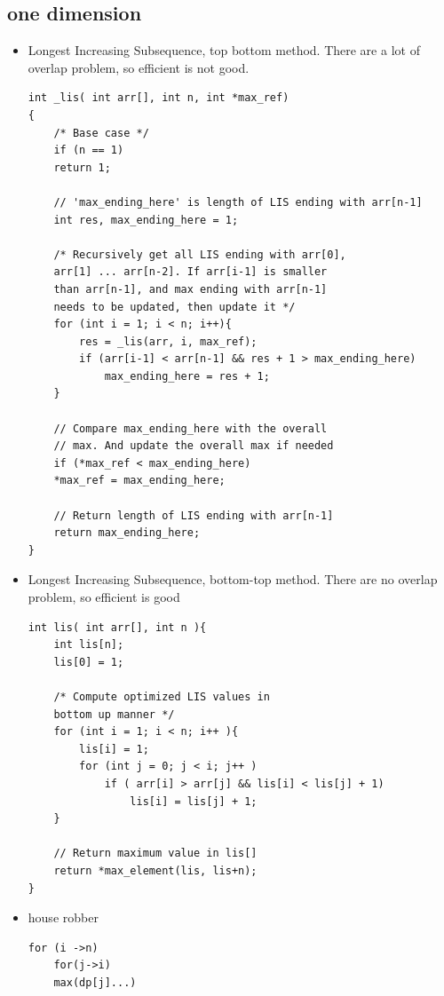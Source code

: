 \documentclass[a4paper,11pt,twoside]{book}
\begin{document}
\subsection{one dimension}
\begin{itemize}
	
	\item Longest Increasing Subsequence, top bottom method. There are a lot of overlap problem, so efficient is not good.

\begin{lstlisting}[numbers=none]
int _lis( int arr[], int n, int *max_ref)
{
	/* Base case */
	if (n == 1)
	return 1;
	
	// 'max_ending_here' is length of LIS ending with arr[n-1]
	int res, max_ending_here = 1;
	
	/* Recursively get all LIS ending with arr[0],
	arr[1] ... arr[n-2]. If arr[i-1] is smaller
	than arr[n-1], and max ending with arr[n-1]
	needs to be updated, then update it */
	for (int i = 1; i < n; i++){
		res = _lis(arr, i, max_ref);
		if (arr[i-1] < arr[n-1] && res + 1 > max_ending_here)
			max_ending_here = res + 1;
	}
	
	// Compare max_ending_here with the overall
	// max. And update the overall max if needed
	if (*max_ref < max_ending_here)
	*max_ref = max_ending_here;
	
	// Return length of LIS ending with arr[n-1]
	return max_ending_here;
}
\end{lstlisting}

	\item Longest Increasing Subsequence, bottom-top method. There are no overlap problem, so efficient is good

\begin{lstlisting}[numbers=none]
int lis( int arr[], int n ){
	int lis[n];
	lis[0] = 1;  
	
	/* Compute optimized LIS values in
	bottom up manner */
	for (int i = 1; i < n; i++ ){
		lis[i] = 1;
		for (int j = 0; j < i; j++ ) 
			if ( arr[i] > arr[j] && lis[i] < lis[j] + 1)
				lis[i] = lis[j] + 1;
	}
	
	// Return maximum value in lis[]
	return *max_element(lis, lis+n);
}
\end{lstlisting}


	\item house robber
\begin{lstlisting}[numbers=none]
	for (i ->n)
	for(j->i)
	max(dp[j]...)
\end{lstlisting}



\end{itemize}
\end{document}
